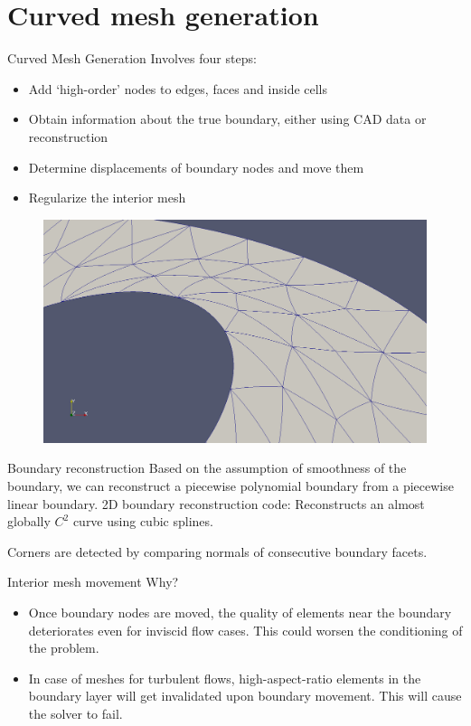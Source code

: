 \documentclass[t,12pt]{beamer}
\begin{document}
\section{Curved mesh generation}

\begin{frame}{Curved Mesh Generation}
Involves four steps:
\begin{itemize}
	\item Add `high-order' nodes to edges, faces and inside cells
	\item Obtain information about the true boundary, either using CAD data or reconstruction
	\item Determine displacements of boundary nodes and move them
	\item Regularize the interior mesh
\end{itemize}
\begin{figure}
	\includegraphics[scale=0.1]{coarse-curved-mesh-zoomed1}
\end{figure}
\end{frame}

\begin{frame}{Boundary reconstruction}
Based on the assumption of smoothness of the boundary, we can reconstruct a piecewise polynomial boundary from a piecewise linear boundary.
\vspace{0.5in}
2D boundary reconstruction code: Reconstructs an almost globally $C^2$ curve using cubic splines.

Corners are detected by comparing normals of consecutive boundary facets.
\end{frame}

\begin{frame}{Interior mesh movement}
Why?
\begin{itemize}
	\item Once boundary nodes are moved, the quality of elements near the boundary deteriorates even for inviscid flow cases. This could worsen the conditioning of the problem.
	\item In case of meshes for turbulent flows, high-aspect-ratio elements in the boundary layer will get invalidated upon boundary movement. This will cause the solver to fail.
\end{itemize}
\end{frame}
\end{document}
